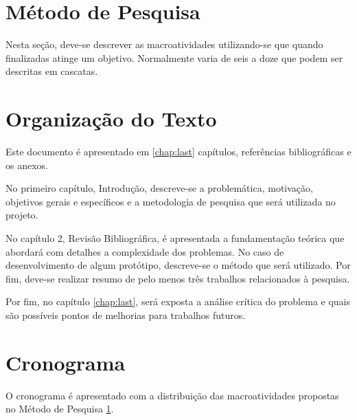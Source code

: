 \section{Método de Pesquisa}
\label{metodo-pesquisa}
Nesta seção, deve-se descrever as macroatividades utilizando-se que quando finalizadas atinge um objetivo. Normalmente varia de seis a doze que podem ser descritas em cascatas. 

\section{Organização do Texto}
Este documento é apresentado em \ref{chap:last} capítulos, referências bibliográficas e os anexos.

No primeiro capítulo, Introdução, descreve-se a problemática, motivação, objetivos gerais e específicos e a metodologia de pesquisa que será utilizada no projeto. 

No capítulo 2, Revisão Bibliográfica, é apresentada a fundamentação teórica que abordará com detalhes a complexidade dos problemas. No caso de desenvolvimento de algum protótipo, descreve-se o método que será utilizado. Por fim, deve-se realizar resumo de pelo menos três trabalhos relacionados à pesquisa.

Por fim, no capítulo \ref{chap:last}, será exposta a análise crítica do problema e quais são possíveis pontos de melhorias para trabalhos futuros.

\newpage
\section{Cronograma}
O cronograma é apresentado com a distribuição das macroatividades propostas no Método de Pesquisa \ref{metodo-pesquisa}.


